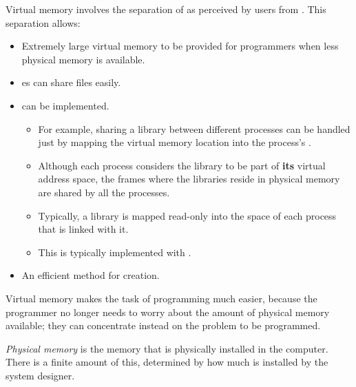 \begin{definition}\label{def:Virtual_Memory}
  Virtual memory involves the separation of  as perceived by users from .
  This separation allows:
  \begin{itemize}[noitemsep]
  \item Extremely large virtual memory to be provided for programmers when less physical memory is available.
  \item {}es can share files easily.
  \item {} can be implemented.
    \begin{itemize}[noitemsep]
    \item For example, sharing a library between different processes can be handled just by mapping the virtual memory location into the process's .
    \item Although each process considers the library to be part of \textbf{its} virtual address space, the frames where the libraries reside in physical memory are shared by all the processes.
    \item Typically, a library is mapped read-only into the space of each process that is linked with it.
    \item This is typically implemented with .
    \end{itemize}
  \item An efficient method for  creation.
\end{itemize}

  Virtual memory makes the task of programming much easier, because the programmer no longer needs to worry about the amount of physical memory available; they can concentrate instead on the problem to be programmed.
\end{definition}

\begin{definition}\label{def:Physical_Memory}
  \emph{Physical memory} is the memory that is physically installed in the computer.
  There is a finite amount of this, determined by how much is installed by the system designer.
\end{definition}

